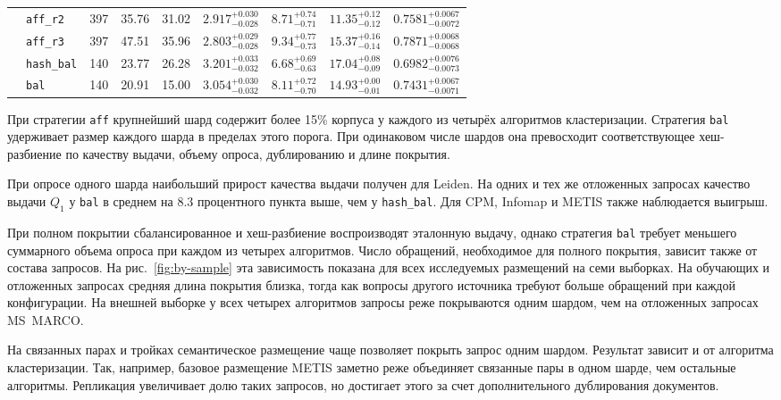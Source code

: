 \documentclass[10pt, a4paper, twoside]{article}
\newcommand{\strategy}[1]{\texttt{#1}}
\begin{document}
\begin{minipage}{\textwidth}
\begin{tabular}{|l|l|l|l|l|l|l|l|l|}
\cline{2-9}
 & \strategy{aff\_r2} & 397 & 35.76 & 31.02 & $2.917^{+0.030}_{-0.028}$ & $8.71^{+0.74}_{-0.71}$ & $11.35^{+0.12}_{-0.12}$ & $0.7581^{+0.0067}_{-0.0072}$\\
\cline{2-9}
 & \strategy{aff\_r3} & 397 & 47.51 & 35.96 & $2.803^{+0.029}_{-0.028}$ & $9.34^{+0.77}_{-0.73}$ & $15.37^{+0.16}_{-0.14}$ & $0.7871^{+0.0068}_{-0.0068}$\\
\cline{2-9}
 & \strategy{hash\_bal} & 140 & 23.77 & 26.28 & $3.201^{+0.033}_{-0.032}$ & $6.68^{+0.69}_{-0.63}$ & $17.04^{+0.08}_{-0.09}$ & $0.6982^{+0.0076}_{-0.0073}$\\
\cline{2-9}
 & \strategy{bal} & 140 & 20.91 & 15.00 & $3.054^{+0.030}_{-0.032}$ & $8.11^{+0.72}_{-0.70}$ & $14.93^{+0.00}_{-0.01}$ & $0.7431^{+0.0067}_{-0.0071}$\\
\hline
\end{tabular}
\end{minipage}
\begin{ntvbody}

При стратегии \strategy{aff} крупнейший шард содержит более 15\% корпуса у каждого из четырёх алгоритмов кластеризации.
Стратегия \strategy{bal} удерживает размер каждого шарда в пределах этого порога.
При одинаковом числе шардов она превосходит соответствующее хеш-разбиение по качеству выдачи, объему опроса, дублированию и длине покрытия.

При опросе одного шарда наибольший прирост качества выдачи получен для Leiden.
На одних и тех же отложенных запросах качество выдачи $Q_1$ у \strategy{bal} в среднем на 8.3 процентного пункта выше, чем у \strategy{hash\_bal}.
Для CPM, Infomap и METIS также наблюдается выигрыш.

При полном покрытии сбалансированное и хеш-разбиение воспроизводят эталонную выдачу, однако стратегия \strategy{bal} требует меньшего суммарного объема опроса при каждом из четырех алгоритмов.
Число обращений, необходимое для полного покрытия, зависит также от состава запросов.
На рис.~\ref{fig:by-sample} эта зависимость показана для всех исследуемых размещений на семи выборках.
На обучающих и отложенных запросах средняя длина покрытия близка, тогда как вопросы другого источника требуют больше обращений при каждой конфигурации.
На внешней выборке у всех четырех алгоритмов запросы реже покрываются одним шардом, чем на отложенных запросах MS~MARCO.

На связанных парах и тройках семантическое размещение чаще позволяет покрыть запрос одним шардом.
Результат зависит и от алгоритма кластеризации.
Так, например, базовое размещение METIS заметно реже объединяет связанные пары в одном шарде, чем остальные алгоритмы.
Репликация увеличивает долю таких запросов, но достигает этого за счет дополнительного дублирования документов.

\end{ntvbody}
\end{document}
